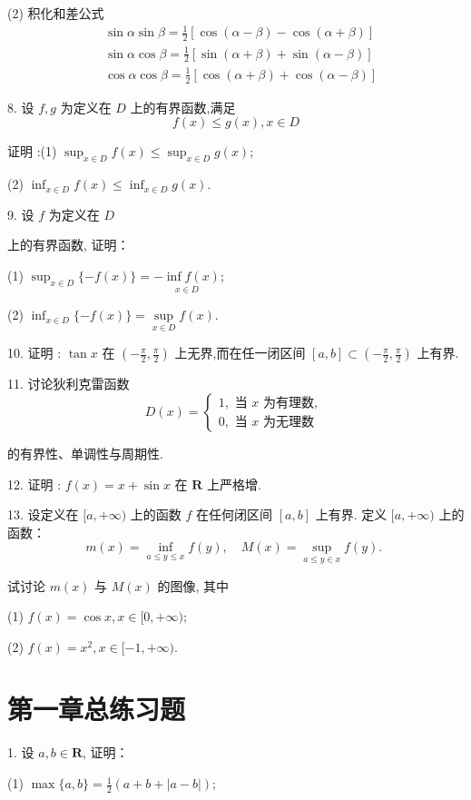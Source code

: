 (2) 积化和差公式
\[
\begin{aligned}
	&\sin \alpha \sin \beta=\frac{1}{2}[\cos (\alpha-\beta)-\cos (\alpha+\beta)] \\
	&\sin \alpha \cos \beta=\frac{1}{2}[\sin (\alpha+\beta)+\sin (\alpha-\beta)] \\
	&\cos \alpha \cos \beta=\frac{1}{2}[\cos (\alpha+\beta)+\cos (\alpha-\beta)]
\end{aligned}
\]

8. 设 $f, g$ 为定义在 $D$ 上的有界函数,满足
\[
f(x) \leqslant g(x), x \in D
\]

证明 :(1) $\sup _{x \in D} f(x) \leqslant \sup _{x \in D} g(x) ; $

(2) $ \inf _{x \in D} f(x) \leqslant \inf _{x \in D} g(x) .$

9. 设 $ f $ 为定义在 $ D ${ 上的有界函数, 证明：

(1) $ \sup _{x \in D}\{-f(x)\}=\underset{x \in D}{-\inf f(x)} ;$

(2) $ \inf _{x \in D}\{-f(x)\}=\underset{x \in D}{\sup } f(x) .$

10. 证明 : $ \tan x $ 在 $\left(-\frac{\pi}{2}, \frac{\pi}{2}\right) $ 上无界,而在任一闭区间 $[a, b] \subset\left(-\frac{\pi}{2}, \frac{\pi}{2}\right) $ 上有界.

11. 讨论狄利克雷函数
\[
D(x)=\left\{\begin{array}{l}
	1, \text { 当 } x \text { 为有理数, } \\
	0, \text { 当 } x \text { 为无理数 }
\end{array}\right.
\]

的有界性、单调性与周期性.

12. 证明 : $f(x)=x+\sin x $ 在 $ \mathbf{R} $ 上严格增.

13. 设定义在 $[a,+\infty) $ 上的函数 $ f $ 在任何闭区间 $[a, b] $ 上有界. 定义 $[a,+\infty) $ 上的函数：
\[
m(x)=\inf _{a \leqslant y \leqslant x} f(y), \quad M(x)=\sup _{a \leq y \in x} f(y) \text {. }
\]

试讨论 $m(x)$ 与 $M(x)$ 的图像, 其中

(1) $ f(x)=\cos x, x \in[0,+\infty) ; $

(2) $ f(x)=x^{2}, x \in[-1,+\infty) .$

\section{第一章总练习题}

1. 设 $a, b \in \mathbf{R}$, 证明：

(1) $ \max \{a, b\}=\frac{1}{2}(a+b+|a-b|) ;$

}
